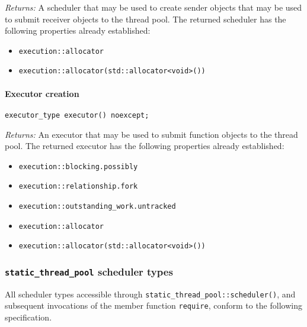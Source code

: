\documentclass[a4paper,12pt,notitlepage,twoside,openright]{article}
\begin{document}
\emph{Returns:} A scheduler that may be used to create sender objects
that may be used to submit receiver objects to the thread pool. The
returned scheduler has the following properties already established:

\begin{itemize}

\item
  \texttt{execution::allocator}
\item
  \texttt{execution::allocator(std::allocator<void>())}
\end{itemize}

\hypertarget{executor-creation}{%
\paragraph{Executor creation}\label{executor-creation}}

\begin{verbatim}
executor_type executor() noexcept;
\end{verbatim}

\emph{Returns:} An executor that may be used to submit function objects
to the thread pool. The returned executor has the following properties
already established:

\begin{itemize}

\item
  \texttt{execution::blocking.possibly}
\item
  \texttt{execution::relationship.fork}
\item
  \texttt{execution::outstanding_work.untracked}
\item
  \texttt{execution::allocator}
\item
  \texttt{execution::allocator(std::allocator<void>())}
\end{itemize}

\hypertarget{static_thread_pool-scheduler-types}{%
\subsubsection{\texorpdfstring{\texttt{static_thread_pool}
scheduler
types}{ scheduler types}}\label{static_thread_pool-scheduler-types}}

All scheduler types accessible through
\texttt{static_thread_pool::scheduler()}, and subsequent
invocations of the member function \texttt{require}, conform
to the following specification.
\end{document}
